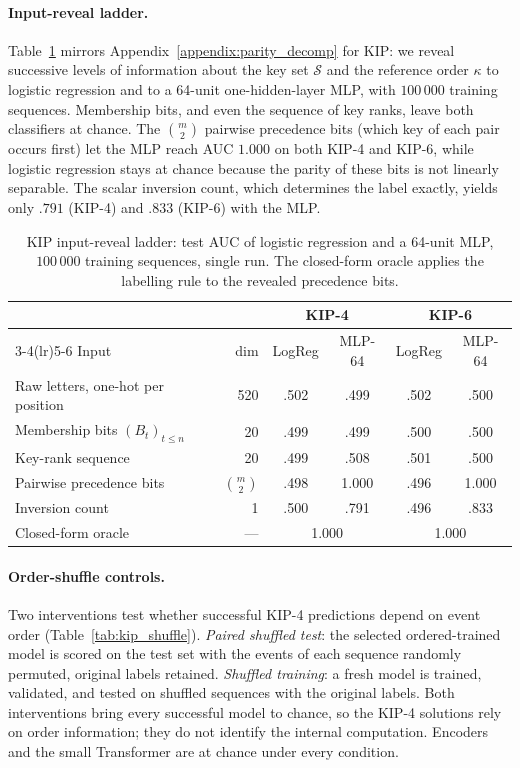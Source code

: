 \documentclass{article} %
\theoremstyle{plain}
\theoremstyle{definition}
\theoremstyle{remark}
\begin{document}
\paragraph{Input-reveal ladder.}
Table~\ref{tab:kip_reveal} mirrors Appendix~\ref{appendix:parity_decomp} for KIP: we reveal successive levels of information about the key set $\mathcal{S}$ and the reference order $\kappa$ to logistic regression and to a 64-unit one-hidden-layer MLP, with $100\,000$ training sequences. Membership bits, and even the sequence of key ranks, leave both classifiers at chance. The $\binom{m}{2}$ pairwise precedence bits (which key of each pair occurs first) let the MLP reach AUC $1.000$ on both KIP-4 and KIP-6, while logistic regression stays at chance because the parity of these bits is not linearly separable. The scalar inversion count, which determines the label exactly, yields only $.791$ (KIP-4) and $.833$ (KIP-6) with the MLP.

\begin{table}[h]
\centering\small
\caption{KIP input-reveal ladder: test AUC of logistic regression and a 64-unit MLP, $100\,000$ training sequences, single run. The closed-form oracle applies the labelling rule to the revealed precedence bits.}
\label{tab:kip_reveal}
\begin{tabular}{@{}lrcccc@{}}
\toprule
 & & \multicolumn{2}{c}{KIP-4} & \multicolumn{2}{c}{KIP-6} \\
\cmidrule(lr){3-4}\cmidrule(lr){5-6}
Input & dim & LogReg & MLP-64 & LogReg & MLP-64 \\
\midrule
Raw letters, one-hot per position & 520 & .502 & .499 & .502 & .500 \\
Membership bits $(B_t)_{t\le n}$ & 20 & .499 & .499 & .500 & .500 \\
Key-rank sequence & 20 & .499 & .508 & .501 & .500 \\
Pairwise precedence bits & $\binom{m}{2}$ & .498 & 1.000 & .496 & 1.000 \\
Inversion count & 1 & .500 & .791 & .496 & .833 \\
Closed-form oracle & --- & \multicolumn{2}{c}{1.000} & \multicolumn{2}{c}{1.000} \\
\bottomrule
\end{tabular}
\end{table}

\paragraph{Order-shuffle controls.}
Two interventions test whether successful KIP-4 predictions depend on event order (Table~\ref{tab:kip_shuffle}). \emph{Paired shuffled test}: the selected ordered-trained model is scored on the test set with the events of each sequence randomly permuted, original labels retained. \emph{Shuffled training}: a fresh model is trained, validated, and tested on shuffled sequences with the original labels. Both interventions bring every successful model to chance, so the KIP-4 solutions rely on order information; they do not identify the internal computation. Encoders and the small Transformer are at chance under every condition.
\end{document}
